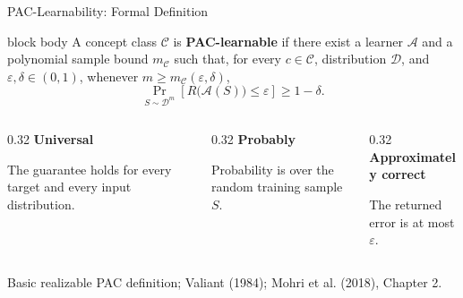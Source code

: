 \documentclass[aspectratio=169,10pt]{beamer}
\newcommand{\D}{\mathcal{D}}
\newcommand{\C}{\mathcal{C}}
\newcommand{\Aalg}{\mathcal{A}}
\newcommand{\eps}{\varepsilon}
\newcommand{\SourceNote}[1]{%
  \vfill
  \begin{flushright}
    {\scriptsize\color{midgray}#1}
  \end{flushright}
}
\begin{document}
\begin{frame}[t]{PAC-Learnability: Formal Definition}
  \vspace{0.04cm}
  \begin{beamercolorbox}[rounded=true,sep=0.22cm,wd=\linewidth]{block body}
    A concept class $\C$ is \textbf{PAC-learnable} if there exist a learner $\Aalg$ and a polynomial sample bound $m_{\C}$ such that, for every $c\in\C$, distribution $\D$, and $\eps,\delta\in(0,1)$, whenever $m\ge m_{\C}(\eps,\delta)$,
    \[
      \Pr_{S\sim\D^m}\!\left[R\bigl(\Aalg(S)\bigr)\le\eps\right]\ge 1-\delta.
    \]
  \end{beamercolorbox}
  \vspace{0.18cm}
  \begin{columns}[T,totalwidth=\textwidth]
    \begin{column}{0.32\textwidth}
      \centering\textbf{Universal}\par
      The guarantee holds for every target and every input distribution.
    \end{column}
    \begin{column}{0.32\textwidth}
      \centering\textbf{Probably}\par
      Probability is over the random training sample $S$.
    \end{column}
    \begin{column}{0.32\textwidth}
      \centering\textbf{Approximately correct}\par
      The returned error is at most $\eps$.
    \end{column}
  \end{columns}
  \SourceNote{Basic realizable PAC definition; Valiant (1984); Mohri et al. (2018), Chapter 2.}
\end{frame}
\end{document}
